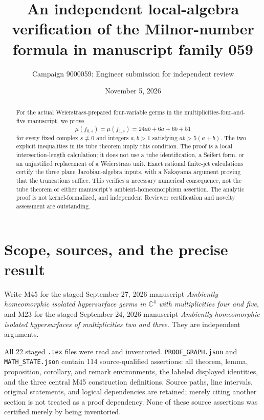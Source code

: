 \documentclass[11pt]{article}
\title{An independent local-algebra verification of the Milnor-number
formula in manuscript family 059}
\author{Campaign 9000059: Engineer submission for independent review}
\date{November 5, 2026}
\newcommand{\C}{\mathbb C}
\begin{document}
\maketitle

\begin{abstract}
For the actual Weierstrass-prepared four-variable germs in the
multiplicities-four-and-five manuscript, we prove
\[
 \mu(f_{0,s})=\mu(f_{1,s})=24ab+6a+6b+51
\]
for every fixed complex \(s\ne0\) and integers \(a,b>1\) satisfying
\(ab>5(a+b)\).  The two explicit inequalities in its tube theorem
imply this condition.  The proof is a local intersection-length
calculation; it does not use a tube identification, a Seifert form,
or an unjustified replacement of a Weierstrass unit.  Exact rational
finite-jet calculations certify the three plane Jacobian-algebra
inputs, with a Nakayama argument proving that the truncations suffice.
This verifies a necessary numerical consequence, not the tube theorem
or either manuscript's ambient-homeomorphism assertion.  The analytic
proof is not kernel-formalized, and independent Reviewer certification
and novelty assessment are outstanding.
\end{abstract}

\section{Scope, sources, and the precise result}

Write M45 for the staged September 27, 2026 manuscript
\emph{Ambiently homeomorphic isolated hypersurface germs in
\(\C^4\) with multiplicities four and five}, and M23 for the staged
September 24, 2026 manuscript
\emph{Ambiently homeomorphic isolated hypersurfaces of multiplicities
two and three}.  They are independent arguments.

All 22 staged \texttt{.tex} files were read and inventoried.
\texttt{PROOF\_GRAPH.json} and \texttt{MATH\_STATE.json} contain
114 source-qualified assertions: all theorem, lemma, proposition,
corollary, and remark environments, the labeled displayed identities,
and the three central M45 construction definitions.  Source paths,
line intervals, original statements, and logical dependencies are
retained; merely citing another section is not treated as a proof
dependency.  None of these source assertions was certified merely
by being inventoried.
\end{document}
